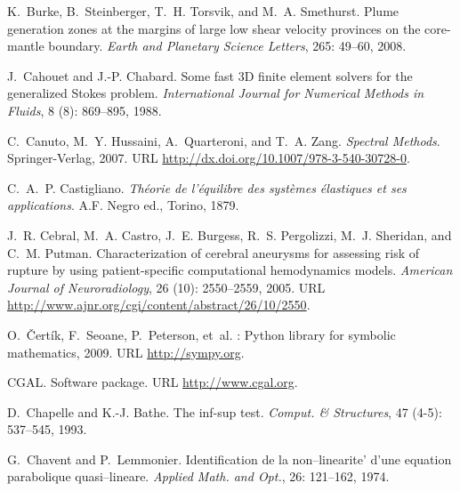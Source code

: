 \begin{thebibliography}{467}
K.~Burke, B.~Steinberger, T.~H. Torsvik, and M.~A. Smethurst.
\newblock Plume generation zones at the margins of large low shear velocity
  provinces on the core-mantle boundary.
\newblock \emph{Earth and Planetary Science Letters}, 265: 49--60,
  2008.

J.~Cahouet and J.-P. Chabard.
\newblock Some fast {3D} finite element solvers for the generalized {S}tokes
  problem.
\newblock \emph{International Journal for Numerical Methods in Fluids},
  8 (8): 869--895, 1988.

C.~Canuto, M.~Y. Hussaini, A.~Quarteroni, and T.~A. Zang.
\newblock \emph{Spectral Methods}.
\newblock Springer-Verlag, 2007.
\newblock URL \url{http://dx.doi.org/10.1007/978-3-540-30728-0}.

C.~A.~P. Castigliano.
\newblock \emph{Th\'eorie de l'\'equilibre des syst\`emes \'elastiques et ses
  applications}.
\newblock A.F. Negro ed., Torino, 1879.

J.~R. Cebral, M.~A. Castro, J.~E. Burgess, R.~S. Pergolizzi, M.~J. Sheridan,
  and C.~M. Putman.
\newblock Characterization of cerebral aneurysms for assessing risk of rupture
  by using patient-specific computational hemodynamics models.
\newblock \emph{American Journal of Neuroradiology}, 26 (10):
  2550--2559, 2005.
\newblock URL \url{http://www.ajnr.org/cgi/content/abstract/26/10/2550}.

O.~\v{C}ert\'{i}k, F.~Seoane, P.~Peterson, et~al.
: {Python} library for symbolic mathematics, 2009.
\newblock URL \url{http://sympy.org}.

CGAL.
\newblock Software package.
\newblock URL \url{http://www.cgal.org}.

D.~Chapelle and K.-J. Bathe.
\newblock The inf-sup test.
\newblock \emph{Comput. \& Structures}, 47 (4-5): 537--545,
  1993.

G.~Chavent and P.~Lemmonier.
\newblock Identification de la non--linearite' d'une equation parabolique
  quasi--lineare.
\newblock \emph{Applied Math. and Opt.}, 26: 121--162, 1974.


\end{thebibliography}
